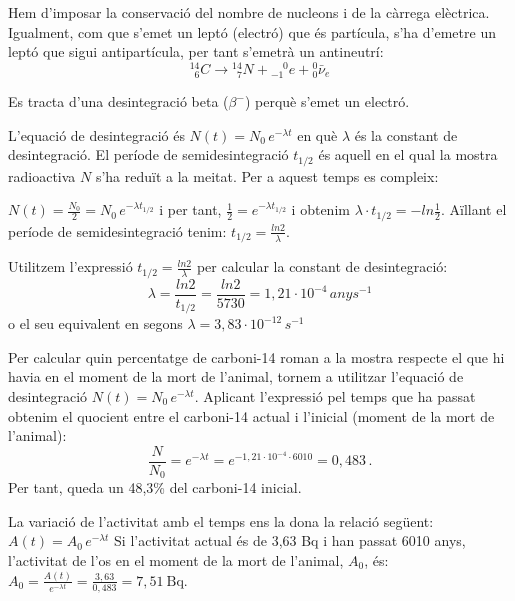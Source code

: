 \begin{solapartat}
 Hem d'imposar la conservació del nombre de nucleons i de la càrrega elèctrica. Igualment, com que s'emet un leptó (electró) que és partícula, s'ha d'emetre un leptó que sigui antipartícula, per tant s'emetrà un antineutrí:
\[ {}^{14}_{\phantom{1}6}C \to {}^{14}_{\phantom{1}7}N + {}^{\phantom{-}0}_{-1}e + {}^{0}_{0}\bar{\nu}_e \]

 Es tracta d'una desintegració beta ($\beta^-$) perquè s'emet un electró.

 L'equació de desintegració és $N(t) = N_0\,e^{-\lambda t}$ en què $\lambda$ és la constant de desintegració. El període de semidesintegració $t_{1/2}$ és aquell en el qual la mostra radioactiva $N$ s'ha reduït a la meitat. Per a aquest temps es compleix:

$N(t) = \frac{N_0}{2} = N_0\,e^{-\lambda t_{1/2}}$ i per tant, $\frac{1}{2} = e^{-\lambda t_{1/2}}$ i obtenim $\lambda\cdot t_{1/2} = -ln\frac{1}{2}$. Aïllant el període de semidesintegració tenim: $t_{1/2} = \frac{ln2}{\lambda}$.
\end{solapartat}

\begin{solapartat}
 Utilitzem l'expressió $t_{1/2} = \frac{ln2}{\lambda}$ per calcular la constant de desintegració:
\[ \lambda = \frac{ln2}{t_{1/2}} = \frac{ln2}{5730} = 1,21\cdot 10^{-4}\,anys^{-1} \]
o el seu equivalent en segons $\lambda = 3,83\cdot 10^{-12}\,s^{-1}$

 Per calcular quin percentatge de carboni-14 roman a la mostra respecte el que hi havia en el moment de la mort de l'animal, tornem a utilitzar l'equació de desintegració $N(t) = N_0\,e^{-\lambda t}$. Aplicant l'expressió pel temps que ha passat obtenim el quocient entre el carboni-14 actual i l'inicial (moment de la mort de l'animal):
\[ \frac{N}{N_0} = e^{-\lambda t} = e^{-1,21\cdot 10^{-4}\cdot 6010} = 0,483\,. \]
Per tant, queda un 48,3\% del carboni-14 inicial.

 La variació de l'activitat amb el temps ens la dona la relació següent: $A(t) = A_0\,e^{-\lambda t}$ Si l'activitat actual és de 3,63 Bq i han passat 6010 anys, l'activitat de l'os en el moment de la mort de l'animal, $A_0$, és: $A_0 = \frac{A(t)}{e^{-\lambda t}} = \frac{3,63}{0,483} = 7,51\ \mathrm{Bq}$.
\end{solapartat}
